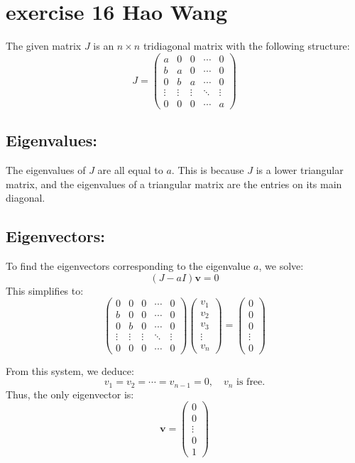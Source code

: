\documentclass{article}
\begin{document}
\section{exercise 16 Hao Wang}

The given matrix \( J \) is an \( n \times n \) tridiagonal matrix with the following structure:
\[
J = \begin{pmatrix}
a & 0 & 0 & \cdots & 0 \\
b & a & 0 & \cdots & 0 \\
0 & b & a & \cdots & 0 \\
\vdots & \vdots & \vdots & \ddots & \vdots \\
0 & 0 & 0 & \cdots & a
\end{pmatrix}
\]

\subsection*{Eigenvalues:}
The eigenvalues of \( J \) are all equal to \( a \). This is because \( J \) is a lower triangular matrix, and the eigenvalues of a triangular matrix are the entries on its main diagonal.

\subsection*{Eigenvectors:}
To find the eigenvectors corresponding to the eigenvalue \( a \), we solve:
\[
(J - a I) \mathbf{v} = 0
\]
This simplifies to:
\[
\begin{pmatrix}
0 & 0 & 0 & \cdots & 0 \\
b & 0 & 0 & \cdots & 0 \\
0 & b & 0 & \cdots & 0 \\
\vdots & \vdots & \vdots & \ddots & \vdots \\
0 & 0 & 0 & \cdots & 0
\end{pmatrix}
\begin{pmatrix}
v_1 \\
v_2 \\
v_3 \\
\vdots \\
v_n
\end{pmatrix}
=
\begin{pmatrix}
0 \\
0 \\
0 \\
\vdots \\
0
\end{pmatrix}
\]

From this system, we deduce:
\[
v_1 = v_2 = \cdots = v_{n-1} = 0, \quad v_n \text{ is free.}
\]
Thus, the only eigenvector is:
\[
\mathbf{v} = \begin{pmatrix}
0 \\
0 \\
\vdots \\
0 \\
1
\end{pmatrix}
\]
\end{document}
